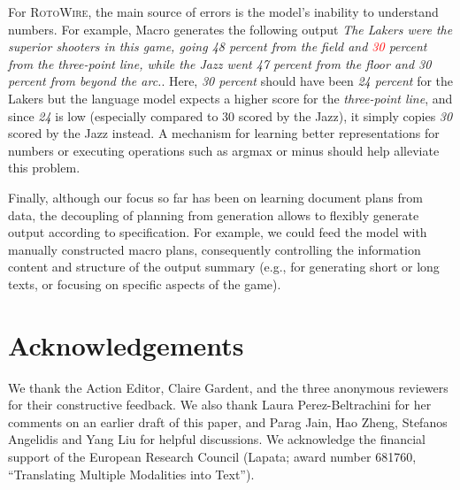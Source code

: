 \documentclass[11pt,a4paper]{article}
\begin{document}
For \textsc{RotoWire}, the main source of errors is the model's
inability to understand numbers. For example, Macro generates the
following output \textsl{The Lakers were the superior shooters in this
  game, going 48 percent from the field and \textcolor{red}{30}
  percent from the three-point line, while the Jazz went 47 percent
  from the floor and 30 percent from beyond the arc.}. Here,
\textsl{30 percent} should have been \textsl{24 percent} for the
Lakers but the language model expects a higher score for the
\textsl{three-point line}, and since \textsl{24} is low (especially
compared to 30 scored by the Jazz), it simply copies \textsl{30}
scored by the Jazz instead. A mechanism for learning better
representations for numbers \cite{wallace-etal-2019-nlp} or executing
operations such as argmax or minus \cite{nie-etal-2018-operation}
should help alleviate this problem.

Finally, although our focus so far has been on learning document plans
from data, the decoupling of planning from generation allows to
flexibly generate output according to specification. For example, we
could feed the model with manually constructed macro plans,
consequently controlling the information content and structure of the
output summary (e.g., for generating short or long texts, or focusing
on specific aspects of the game).



\section*{Acknowledgements}
We thank the Action Editor, Claire Gardent, and the three anonymous reviewers 
for their constructive feedback. 
We also thank Laura Perez-Beltrachini for her comments on an earlier draft of this paper, and
Parag Jain, Hao Zheng, Stefanos Angelidis and Yang Liu for
helpful discussions. 
We acknowledge the financial support of the European Research Council 
(Lapata; award number 681760, ``Translating Multiple Modalities into Text'').



\end{document}
